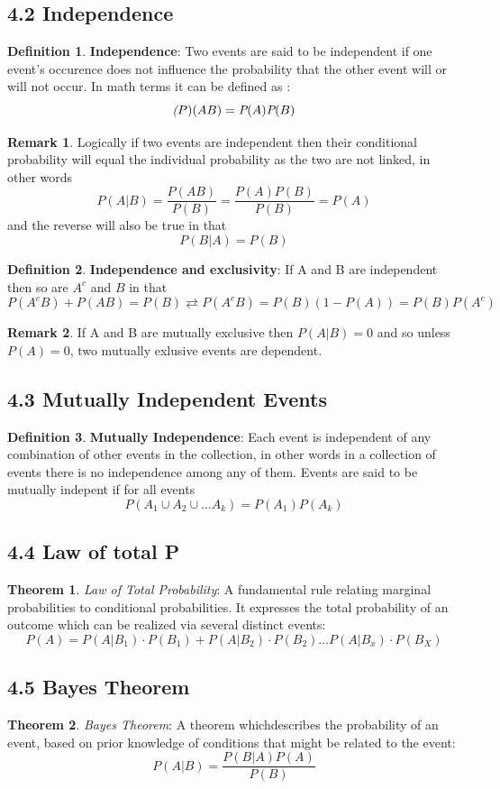 \documentclass[12pt]{amsart}
\theoremstyle{definition}
\newtheorem{theorem}{Theorem}  %
\newtheorem{definition}{Definition} %
\newtheorem*{remark}{Remark}        %
\numberwithin{equation}{theorem}    %
\begin{document}
\subsection*{4.2 Independence}

\begin{definition}
    \textbf{Independence}: Two events are said to be independent if one event's occurence does not influence the probability that the other event will or will not occur. In math terms it can be defined as :
    $$\textit(P)(AB) = \textit{P}(A)\textit{P}(B)$$
    \begin{remark}
        Logically if two events are independent then their conditional probability will equal the individual probability as the two are not linked, in other words $$P(A|B) = \frac{P(AB)}{P(B)} = \frac{P(A)P(B)}{P(B)} = P(A)$$ and the reverse will also be true in that $$P(B|A) = P(B)$$
    \end{remark}
\end{definition}

\begin{definition}
    \textbf{Independence and exclusivity}:
    If A and B are independent then so are $A^c$ and $B$ in that 
    $$P(A^cB) + P(AB) = P(B) \rightleftarrows P(A^cB) = P(B)(1-P(A)) = P(B)P(A^c)$$
    \begin{remark}
        If A and B are mutually exclusive then $P(A|B) = 0$ and so unless $P(A) = 0$, two mutually exlusive events are dependent.
    \end{remark}
\end{definition}


\subsection*{4.3 Mutually Independent Events}

\begin{definition}
    \textbf{Mutually Independence}:
    Each event is independent of any combination of other events in the collection, in other words in a collection of events there is no independence among any of them. Events are said to be mutually indepent if for all events $$P(A_1 \cup A_2 \cup \ldots A_k) = P(A_1)P(A_k)$$
\end{definition}

\subsection*{4.4 Law of total P}

\begin{theorem}
    \textit{Law of Total Probability}:
    A fundamental rule relating marginal probabilities to conditional probabilities. It expresses the total probability of an outcome which can be realized via several distinct events:
    $$P(A) = P(A|B_1) \cdot P(B_1) + P(A|B_2) \cdot P(B_2) \ldots P(A|B_x) \cdot P(B_X)$$

\end{theorem}


\subsection*{4.5 Bayes Theorem}

\begin{theorem}
    \textit{Bayes Theorem}:
    A theorem whichdescribes the probability of an event, based on prior knowledge of conditions that might be related to the event:
    $$P(A|B) = \frac{P(B|A)P(A)}{P(B)}$$

\end{theorem}
\end{document}
